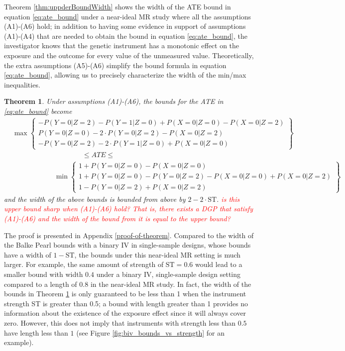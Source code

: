 \documentclass[
]{article}
\theoremstyle{plain}
\newtheorem{theorem}{Theorem}[section]
\begin{document}
Theorem \ref{thm:uppderBoundWidth} shows the width of the ATE bound in equation \eqref{eq:ate_bound} under a near-ideal MR study where all the assumptions (A1)-(A6) hold; in addition to having some evidence in support of assumptions (A1)-(A4) that are needed to obtain the bound in equation \eqref{eq:ate_bound}, the investigator knows that the genetic instrument has a monotonic effect on the exposure and the outcome for every value of the unmeasured value. Theoretically, the extra assumptions (A5)-(A6) simplify the bound formula in equation \eqref{eq:ate_bound}, allowing us to precisely characterize the width of the min/max inequalities.
\begin{theorem}\label{thm:upperBoundWidth} Under assumptions (A1)-(A6), the bounds for the ATE in \eqref{eq:ate_bound} become
  \[
\begin{aligned}
    &\max
      \begin{Bmatrix}
        -P(Y = 0 | Z = 2) - P(Y = 1 | Z = 0) + P(X = 0 | Z = 0) - P(X = 0 | Z = 2) \\
        P(Y = 0 | Z = 0) - 2\cdot P(Y = 0 | Z = 2) - P(X = 0 | Z = 2) \\
        -P(Y = 0 | Z = 2) - 2\cdot P(Y = 1 | Z = 0) + P(X = 0 | Z = 0)
      \end{Bmatrix} \\
    &\qquad \qquad \qquad \qquad \qquad\le ATE \le \\
    &\qquad \qquad \qquad \min
      \begin{Bmatrix}
        1 + P(Y = 0 | Z = 0) - P(X = 0 | Z = 0) \\
        1 + P(Y = 0 | Z = 0) - P(Y = 0 | Z = 2) - P(X = 0 | Z = 0) + P(X = 0 | Z = 2) \\
        1 - P(Y = 0 | Z = 2) +  P(X = 0 | Z = 2)
      \end{Bmatrix}
\end{aligned}
\]
and the width of the above bounds is bounded from above by $2 - 2\cdot \text{ST}$.  \textcolor{red}{is this upper bound sharp when (A1)-(A6) hold? That is, there exists a DGP that satisfy (A1)-(A6) and the width of the bound from it is equal to the upper bound?}
\end{theorem}
The proof is presented in Appendix \ref{proof-of-theorem}. Compared to the width of the Balke Pearl bounds with a binary IV in single-sample designs, whose bounds have a width of $1-\text{ST}$, the bounds under this near-ideal MR setting is much larger. For example, the same amount of strength of $\text{ST} = 0.6$ would lead to a smaller bound with width $0.4$ under a binary IV, single-sample design setting compared to a length of $0.8$ in the near-ideal MR study. In fact, the width of the bounds in Theorem \ref{thm:upperBoundWidth} is only guaranteed to be less than 1 when the instrument strength ST is greater than 0.5; a bound with length greater than 1 provides no information about the existence of the exposure effect since it will always cover zero. However, this does not imply that instruments with strength less than $0.5$ have length less than $1$ (see Figure \ref{fig:biv_bounds_vs_strength} for an example). 
\end{document}
